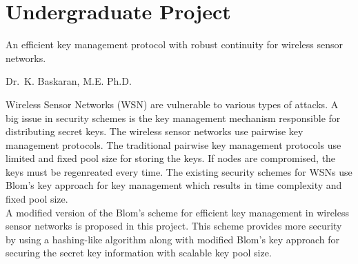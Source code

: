 \documentclass{cv}
\begin{document}
\section{Undergraduate Project}
\begin{description}[leftmargin=50pt,labelwidth=50pt,labelsep=0pt]
  \item[Title] An efficient key management protocol with robust continuity for wireless sensor networks.
  \item[Guide] Dr.\ K. Baskaran, M.E. Ph.D.
  \item[] Wireless Sensor Networks (WSN) are vulnerable to various types of attacks.  A big issue in security schemes is the key management mechanism responsible for distributing secret keys.  The wireless sensor networks use pairwise key management protocols.  The traditional pairwise key management protocols use limited and fixed pool size for storing the keys.  If nodes are compromised, the keys must be regenreated every time.  The existing security schemes for WSNs use Blom's key approach for key management which results in time complexity and fixed pool size.\\
    A modified version of the Blom's scheme for efficient key management in wireless sensor networks is proposed in this project.  This scheme provides more security by using a hashing-like algorithm along with modified Blom's key approach for securing the secret key information with scalable key pool size.
\end{description}
\end{document}
